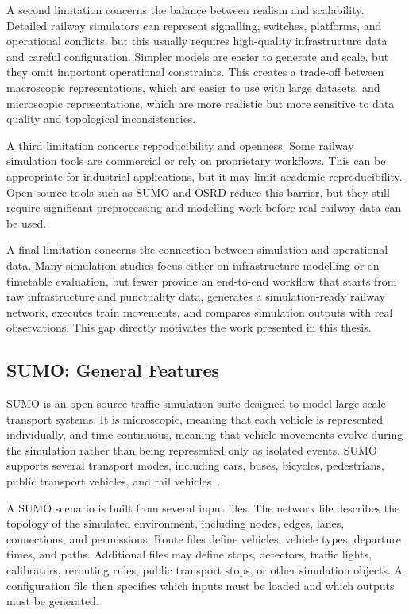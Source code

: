 A second limitation concerns the balance between realism and scalability. Detailed railway simulators can represent 
signalling, switches, platforms, and operational conflicts, but this usually requires high-quality infrastructure data and 
careful configuration. Simpler models are easier to generate and scale, but they omit important operational constraints. 
This creates a trade-off between macroscopic representations, which are easier to use with large datasets, and microscopic 
representations, which are more realistic but more sensitive to data quality and topological inconsistencies.

\newpage

A third limitation concerns reproducibility and openness. Some railway simulation tools are commercial or rely on 
proprietary workflows. This can be appropriate for industrial applications, but it may limit academic reproducibility. 
Open-source tools such as SUMO and OSRD reduce this barrier, but they still require significant preprocessing and modelling 
work before real railway data can be used.

A final limitation concerns the connection between simulation and operational data. Many simulation studies focus either 
on infrastructure modelling or on timetable evaluation, but fewer provide an end-to-end workflow that starts from raw 
infrastructure and punctuality data, generates a simulation-ready railway network, executes train movements, and compares 
simulation outputs with real observations. This gap directly motivates the work presented in this thesis.

\subsection{SUMO\@: General Features}
SUMO is an open-source traffic simulation suite designed to model large-scale transport systems. It is microscopic, 
meaning that each vehicle is represented individually, and time-continuous, meaning that vehicle movements evolve during 
the simulation rather than being represented only as isolated events. SUMO supports several transport modes, including 
cars, buses, bicycles, pedestrians, public transport vehicles, and rail vehicles~\cite{sumo2018,sumo_docs}.

A SUMO scenario is built from several input files. The network file describes the topology of the simulated environment, 
including nodes, edges, lanes, connections, and permissions. Route files define vehicles, vehicle types, departure times, 
and paths. Additional files may define stops, detectors, traffic lights, calibrators, rerouting rules, public transport 
stops, or other simulation objects. A configuration file then specifies which inputs must be loaded and which outputs must 
be generated.

